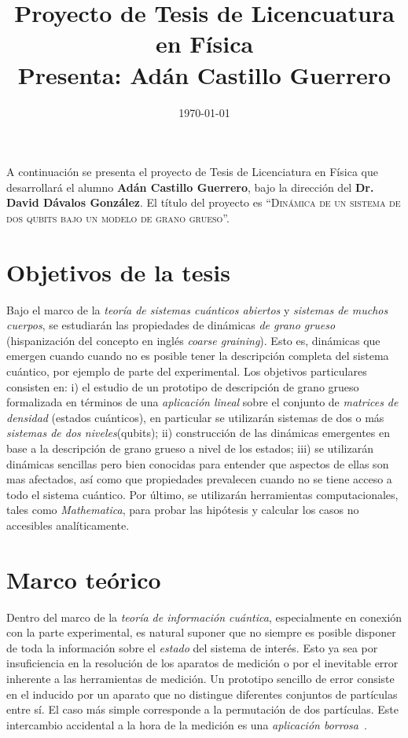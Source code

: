 \documentclass[onecolumn,11pt]{article}
\title{Proyecto de Tesis de Licencuatura en Física\\ Presenta: Adán Castillo Guerrero}
\date{\today}
\begin{document}
\maketitle
\thispagestyle{empty}
A continuación se presenta el proyecto de Tesis de Licenciatura en Física que desarrollará el alumno \textbf{Adán Castillo Guerrero}, bajo la dirección del \textbf{Dr. David Dávalos González}. El título del proyecto es ``\textsc{Dinámica de un sistema de dos qubits bajo un modelo de grano grueso}''.

\section{Objetivos de la tesis}
Bajo el marco de la \textit{teoría de sistemas cuánticos abiertos} y \textit{sistemas de muchos cuerpos}, se estudiarán las propiedades de dinámicas \textit{de grano grueso} (hispanización del concepto en inglés \textit{coarse graining}). Esto es, dinámicas que emergen cuando cuando no es posible tener la descripción completa del sistema cuántico, por ejemplo de parte del experimental. Los objetivos particulares consisten en: i) el estudio de un prototipo de descripción de grano grueso formalizada en términos de una \textit{aplicación lineal} sobre el conjunto de \textit{matrices de densidad} (estados cuánticos), en particular se utilizarán sistemas de dos o más \textit{sistemas de dos niveles}(qubits); ii) construcción de las dinámicas emergentes en base a la descripción de grano grueso a nivel de los estados; iii) se utilizarán dinámicas sencillas pero bien conocidas para entender que aspectos de ellas son mas afectados, así como que propiedades prevalecen cuando no se tiene acceso a todo el sistema cuántico. Por último, se utilizarán herramientas computacionales, tales como \textit{Mathematica}, para probar las hipótesis y calcular los casos no accesibles analíticamente.

\section{Marco teórico}


Dentro del marco de la \textit{teoría de información cuántica}, especialmente en conexión con la parte experimental, es natural suponer que no siempre es posible disponer de toda la información sobre el \textit{estado} del sistema de interés. Esto ya sea por insuficiencia en la resolución de los aparatos de medición o por el inevitable error inherente a las herramientas de medición. Un prototipo sencillo de error consiste en el inducido por un aparato que no distingue diferentes conjuntos de partículas entre sí. El caso más simple corresponde a la permutación de dos partículas. Este intercambio accidental a la hora de la medición es una \textit{aplicación borrosa}~\cite{FuzzyMeasurements}.
\end{document}
